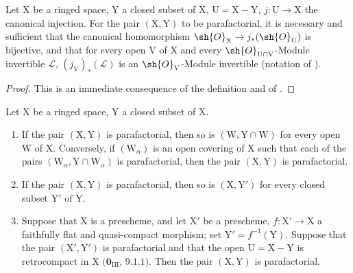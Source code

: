 \begin{proposition}[21.13.5]
\label{IV.21.13.5}
Let $\mathrm{X}$ be a ringed space, $\mathrm{Y}$ a closed subset of $\mathrm{X}$, $\mathrm{U}=\mathrm{X}-\mathrm{Y}$, $j:\mathrm{U}\to\mathrm{X}$ the canonical injection.
For the pair $(\mathrm{X},\mathrm{Y})$ to be parafactorial, it is necessary and sufficient that the canonical homomorphism $\sh{O}_{\mathrm{X}}\to j_*(\sh{O}_{\mathrm{U}})$ is bijective, and that for every open $\mathrm{V}$ of $\mathrm{X}$ and every $\sh{O}_{\mathrm{U}\cap\mathrm{V}}$-Module invertible $\mathscr{L}$, $(j_{\mathrm{V}})_*(\mathscr{L})$ is an $\sh{O}_{\mathrm{V}}$-Module invertible (notation of ).
\end{proposition}

\begin{proof}
This is an immediate consequence of the definition  and of .
\end{proof}

\begin{corollary}[21.13.6]
\label{IV.21.13.6}
Let $\mathrm{X}$ be a ringed space, $\mathrm{Y}$ a closed subset of $\mathrm{X}$.
\begin{enumerate}[label=(\roman*)]
  \item If the pair $(\mathrm{X},\mathrm{Y})$ is parafactorial, then so is $(\mathrm{W},\mathrm{Y}\cap\mathrm{W})$ for every open $\mathrm{W}$ of $\mathrm{X}$.
  Conversely, if $(\mathrm{W}_\alpha)$ is an open covering of $\mathrm{X}$ such that each of the pairs $(\mathrm{W}_\alpha,\mathrm{Y}\cap\mathrm{W}_\alpha)$ is parafactorial, then the pair $(\mathrm{X},\mathrm{Y})$ is parafactorial.
  \item If the pair $(\mathrm{X},\mathrm{Y})$ is parafactorial, then so is $(\mathrm{X},\mathrm{Y}')$ for every closed subset $\mathrm{Y}'$ of $\mathrm{Y}$.
  \item Suppose that $\mathrm{X}$ is a prescheme, and let $\mathrm{X}'$ be a prescheme, $f:\mathrm{X}'\to\mathrm{X}$ a faithfully flat and quasi-compact morphism; set $\mathrm{Y}'=f^{-1}(\mathrm{Y})$.
  Suppose that the pair $(\mathrm{X}',\mathrm{Y}')$ is parafactorial and that the open $\mathrm{U}=\mathrm{X}-\mathrm{Y}$ is retrocompact in $\mathrm{X}$ $(\mathbf{0}_{\mathrm{III}}$, $9.1.1)$.
  Then the pair $(\mathrm{X},\mathrm{Y})$ is parafactorial.
\end{enumerate}
\end{corollary}

